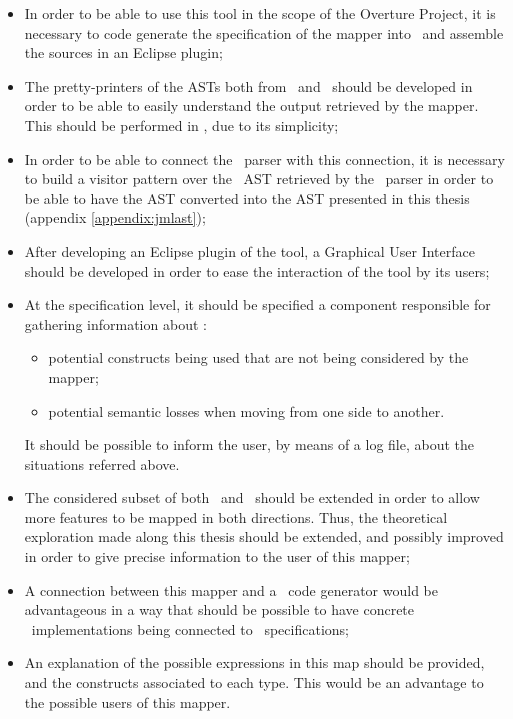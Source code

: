 \begin{itemize}
\item In order to be able to use this tool in the scope of the Overture Project, it is necessary to code generate the specification of the mapper into \java\ and assemble the sources in an Eclipse plugin;
\item The pretty-printers of the ASTs both from \vpp\ and \jml\ should be developed in order to be able to easily understand the output retrieved by the mapper. This should be performed in \java, due to its simplicity;
\item In order to be able to connect the \jml\ parser with this connection, it is necessary to build a visitor pattern over the \jml\ AST retrieved by the \jml\ parser in order to be able to have the AST converted into the AST presented in this thesis (appendix \ref{appendix:jmlast});
\item After developing an Eclipse plugin of the tool, a Graphical User Interface should be developed in order to ease the interaction of the tool by its users;
\item At the specification level, it should be specified a component responsible for gathering information about :
\begin{itemize}
\item potential constructs being used that are not being considered by the mapper;
\item potential semantic losses when moving from one side to another.
\end{itemize}
It should be possible to inform the user, by means of a log file, about the situations referred above. 
\item The considered subset of both \jml\ and \vpp\ should be extended in order to allow more features to be mapped in both directions. Thus, the theoretical exploration made along this thesis should be extended, and possibly improved in order to give precise information to the user of this mapper;
\item A connection between this mapper and a \java\ code generator would be advantageous in a way that should be possible to have concrete \java\ implementations being connected to \jml\ specifications;
\item An explanation of the possible expressions in this map should be provided, and the constructs associated to each type. This would be an advantage to the possible users of this mapper.
\end{itemize}

